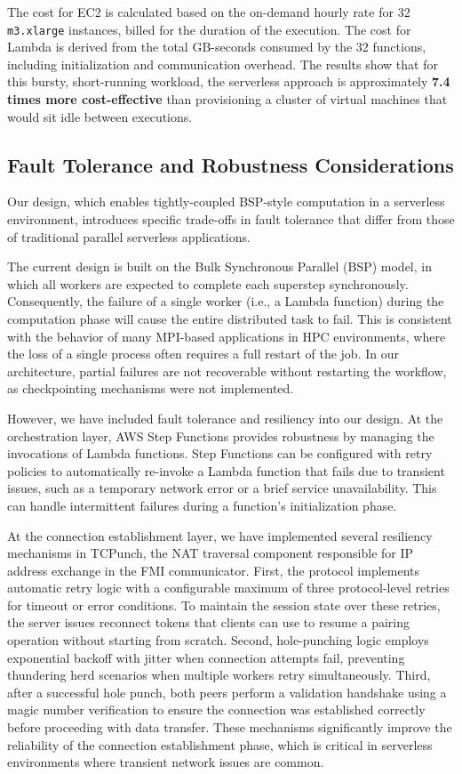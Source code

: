 \documentclass[conference]{IEEEtran}
\begin{document}
The cost for EC2 is calculated based on the on-demand hourly rate for 32 \texttt{m3.xlarge} instances, billed for the duration of the execution. The cost for Lambda is derived from the total GB-seconds consumed by the 32 functions, including initialization and communication overhead. The results show that for this bursty, short-running workload, the serverless approach is approximately \textbf{7.4 times more cost-effective} than provisioning a cluster of virtual machines that would sit idle between executions.

\subsection{Fault Tolerance and Robustness Considerations}
\label{sec:faulttolerance}

Our design, which enables tightly-coupled BSP-style computation in a serverless environment, introduces specific trade-offs in fault tolerance that differ from those of traditional parallel serverless applications. 

The current design is built on the Bulk Synchronous Parallel (BSP) model, in which all workers are expected to complete each superstep synchronously. Consequently, the failure of a single worker (i.e., a Lambda function) during the computation phase will cause the entire distributed task to fail. This is consistent with the behavior of many MPI-based applications in HPC environments, where the loss of a single process often requires a full restart of the job. In our architecture, partial failures are not recoverable without restarting the workflow, as checkpointing mechanisms were not implemented.

However, we have included fault tolerance and resiliency into our design. At the orchestration layer, AWS Step Functions provides robustness by managing the invocations of Lambda functions. Step Functions can be configured with retry policies to automatically re-invoke a Lambda function that fails due to transient issues, such as a temporary network error or a brief service unavailability. This can handle intermittent failures during a function's initialization phase.

At the connection establishment layer, we have implemented several resiliency mechanisms in TCPunch, the NAT traversal component responsible for IP address exchange in the FMI communicator. First, the protocol implements automatic retry logic with a configurable maximum of three protocol-level retries for timeout or error conditions. To maintain the session state over these retries, the server issues reconnect tokens that clients can use to resume a pairing operation without starting from scratch. Second, hole-punching logic employs exponential backoff with jitter when connection attempts fail, preventing thundering herd scenarios when multiple workers retry simultaneously. Third, after a successful hole punch, both peers perform a validation handshake using a magic number verification to ensure the connection was established correctly before proceeding with data transfer. These mechanisms significantly improve the reliability of the connection establishment phase, which is critical in serverless environments where transient network issues are common.
\end{document}
